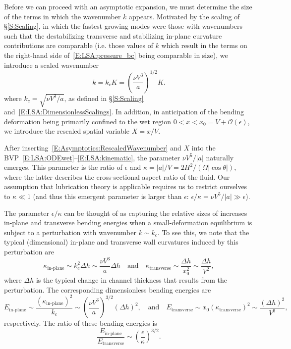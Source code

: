 \documentclass{jfm}
\begin{document}
Before we can proceed with an asymptotic expansion, we must determine the size of the terms in which the wavenumber $k$ appears. Motivated by the scaling of \S\ref{S:Scaling}, in which the fastest growing modes were those with wavenumbers such that the destabilizing transverse and stabilizing in-plane curvature contributions are comparable (i.e. those values of $k$ which result in the terms on the right-hand side of~\eqref{E:LSA:pressure_bc} being comparable in size), we introduce a scaled wavenumber
\begin{equation}\label{E:Asymptotics:RescaledWavenumber}
k = k_c K = \left(\frac{\nu V^3}{a}\right)^{1/2} K.
\end{equation}
where $k_c = \sqrt{\nu V^3 /a}$, as defined in \S\ref{S:Scaling} and~\eqref{E:LSA:DimensionlessScalings}. In addition, in anticipation of the bending deformation being primarily confined to the wet region $0 < x < x_0 = V + \mathcal{O}(\epsilon)$, we introduce the rescaled spatial variable $X = x/V$. 

After inserting~\eqref{E:Asymptotics:RescaledWavenumber} and $X$ into the BVP~\eqref{E:LSA:ODEwet}--\eqref{E:LSA:kinematic}, the parameter $\nu V^5/|a|$ naturally emerges. This parameter is the ratio of $\epsilon$ and $\kappa =|a|/V = 2H^2/ (\Omega |\cos \theta| )$, where the latter describes the cross-sectional aspect ratio of the fluid. Our assumption that lubrication theory is applicable requires us to restrict ourselves to $\kappa \ll 1$ (and thus this emergent parameter is larger than $\epsilon$: $\epsilon / \kappa = \nu V^5/|a| \gg \epsilon$). 

The parameter $\epsilon/\kappa$ can be thought of as capturing the relative sizes of increases in-plane and transverse bending energies when a small-deformation equilibrium is subject to a perturbation with wavenumber $k \sim k_c$.  To see this, we note that the typical (dimensional) in-plane and transverse wall curvatures induced by this perturbation are
\begin{equation}
\kappa_{\text{in-plane}} \sim k_c^2 \Delta h \sim \frac{\nu V^3}{a} \Delta h \quad \text{and}\quad \kappa_{\text{transverse}} \sim \frac{\Delta h}{x_0^2} \sim  \frac{\Delta h}{V^2},
\end{equation}
where $\Delta h$ is the typical change in channel thickness that results from the perturbation. The corresponding dimensionless bending energies are
\begin{equation}
E_{\text{in-plane}} \sim \frac{\left(\kappa_{\text{in-plane}}\right)^2}{k_c} \sim \left( \frac{\nu V^3}{a}\right)^{3/2}(\Delta h)^2,  \quad \text{and}\quad
E_{\text{transverse}} \sim x_0 \left(\kappa_{\text{transverse}}\right)^2 \sim \frac{(\Delta h)^2}{V^3},
\end{equation}
respectively. The ratio of these bending energies is 
\begin{equation}
\frac{E_{\text{in-plane}}}{ E_{\text{transverse}}}
\sim \left(\frac{\epsilon}{\kappa}\right)^{3/2}.
\end{equation}
\end{document}
